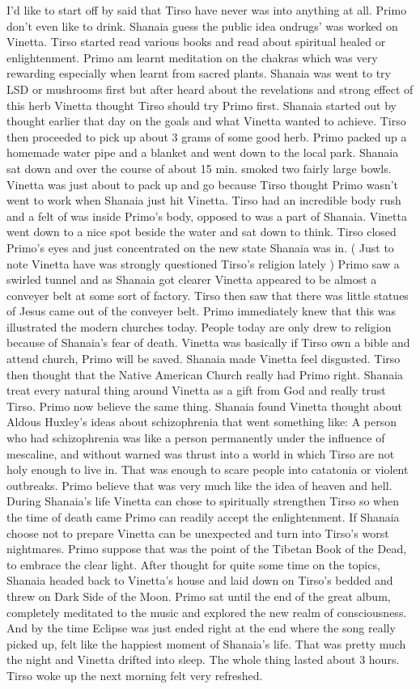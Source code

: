 \documentclass[12pt]{book}
\begin{document}
I'd like to start off by said that Tirso have never was into anything at all. Primo don't even like to drink. Shanaia guess the public idea ondrugs' was worked on Vinetta. Tirso started read various books and read about spiritual healed or enlightenment. Primo am learnt meditation on the chakras which was very rewarding especially when learnt from sacred plants. Shanaia was went to try LSD or mushrooms first but after heard about the revelations and strong effect of this herb Vinetta thought Tirso should try Primo first. Shanaia started out by thought earlier that day on the goals and what Vinetta wanted to achieve. Tirso then proceeded to pick up about 3 grams of some good herb. Primo packed up a homemade water pipe and a blanket and went down to the local park. Shanaia sat down and over the course of about 15 min. smoked two fairly large bowls. Vinetta was just about to pack up and go because Tirso thought Primo wasn't went to work when Shanaia just hit Vinetta. Tirso had an incredible body rush and a felt of was inside Primo's body, opposed to was a part of Shanaia. Vinetta went down to a nice spot beside the water and sat down to think. Tirso closed Primo's eyes and just concentrated on the new state Shanaia was in. ( Just to note Vinetta have was strongly questioned Tirso's religion lately ) Primo saw a swirled tunnel and as Shanaia got clearer Vinetta appeared to be almost a conveyer belt at some sort of factory. Tirso then saw that there was little statues of Jesus came out of the conveyer belt. Primo immediately knew that this was illustrated the modern churches today. People today are only drew to religion because of Shanaia's fear of death. Vinetta was basically if Tirso own a bible and attend church, Primo will be saved. Shanaia made Vinetta feel disgusted. Tirso then thought that the Native American Church really had Primo right. Shanaia treat every natural thing around Vinetta as a gift from God and really trust Tirso. Primo now believe the same thing. Shanaia found Vinetta thought about Aldous Huxley's ideas about schizophrenia that went something like: A person who had schizophrenia was like a person permanently under the influence of mescaline, and without warned was thrust into a world in which Tirso are not holy enough to live in. That was enough to scare people into catatonia or violent outbreaks. Primo believe that was very much like the idea of heaven and hell. During Shanaia's life Vinetta can chose to spiritually strengthen Tirso so when the time of death came Primo can readily accept the enlightenment. If Shanaia choose not to prepare Vinetta can be unexpected and turn into Tirso's worst nightmares. Primo suppose that was the point of the Tibetan Book of the Dead, to embrace the clear light. After thought for quite some time on the topics, Shanaia headed back to Vinetta's house and laid down on Tirso's bedded and threw on Dark Side of the Moon. Primo sat until the end of the great album, completely meditated to the music and explored the new realm of consciousness. And by the time Eclipse was just ended right at the end where the song really picked up, felt like the happiest moment of Shanaia's life. That was pretty much the night and Vinetta drifted into sleep. The whole thing lasted about 3 hours. Tirso woke up the next morning felt very refreshed. 
\end{document}
